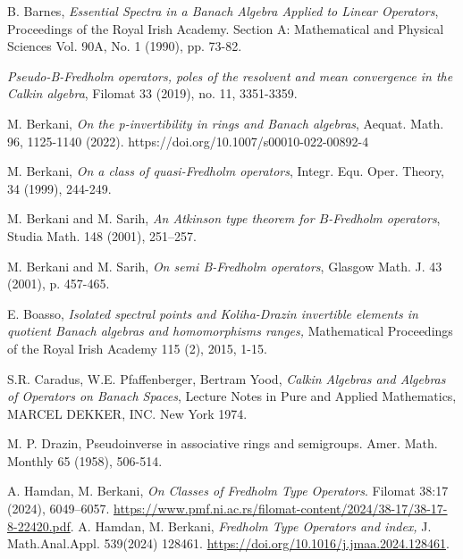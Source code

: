 \documentclass[10pt]{article}
\numberwithin{equation}{section}
\begin{document}
\begin{thebibliography}{5}


 B. Barnes,  \textit{Essential Spectra in a Banach Algebra Applied to Linear
 Operators}, Proceedings of the Royal Irish Academy. Section A: Mathematical
and Physical Sciences Vol. 90A, No. 1 (1990), pp. 73-82.

 \textit{Pseudo-B-Fredholm operators, poles of
the resolvent and mean convergence in the Calkin algebra},
Filomat 33 (2019), no. 11, 3351-3359.

 M. Berkani,   \textit{On the  p-invertibility  in   rings and Banach algebras},
Aequat. Math. 96, 1125-1140 (2022). https://doi.org/10.1007/s00010-022-00892-4

M. Berkani,
 \textit{On a class of quasi-Fredholm operators}, Integr. Equ. Oper.
Theory, 34 (1999), 244-249.


 M. Berkani and M. Sarih,   \textit{ An Atkinson
type theorem for $B$-Fredholm operators},  Studia Math. {148}
(2001), 251--257.

 M. Berkani and M. Sarih, {\it On semi B-Fredholm
operators}, Glasgow Math. J. 43 (2001), p. 457-465.


E. Boasso, \textit{Isolated spectral points and Koliha-Drazin invertible
elements in quotient Banach algebras and homomorphisms ranges,}
Mathematical Proceedings of the Royal Irish Academy 115 (2), 2015,
1-15.

  S.R. Caradus, W.E. Pfaffenberger, Bertram Yood,
\textit{Calkin Algebras and Algebras of Operators on Banach Spaces},
Lecture Notes in Pure and Applied Mathematics,
MARCEL DEKKER, INC. New York 1974.

 { M. P. Drazin,}  Pseudoinverse in
associative rings and semigroups.  Amer. Math. Monthly 65 (1958),
506-514.

 A. Hamdan, M. Berkani, \textit {On Classes of Fredholm Type Operators}. Filomat 38:17 (2024), 6049–6057.
\url{https://www.pmf.ni.ac.rs/filomat-content/2024/38-17/38-17-8-22420.pdf}.
 A. Hamdan, M. Berkani, \textit {Fredholm Type Operators and index,}
J. Math.Anal.Appl. 539(2024) 128461.  \url{https://doi.org/10.1016/j.jmaa.2024.128461}.


\end{thebibliography}
\end{document}
